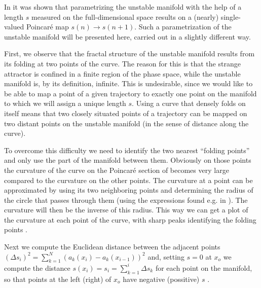 \documentclass[pre,preprint,groupedaddress,showpacs,showkeys]{revtex4}
\begin{document}
  In \cite{Christiansen:97} it was shown that parametrizing the unstable manifold with
  the help of a length $s$ measured on the full-dimensional space
  results on a (nearly) single-valued Poincar\'e map   $s(n) \rightarrow
  s(n+1)$. Such a parametrization of the
  unstable manifold will be presented here, carried out in a slightly
  different way.

  First, we observe that the fractal structure of the unstable
  manifold results from its folding at two points of the curve. The
  reason for this is that the strange attractor is confined in a
  finite region of the phase space, while the unstable manifold is, by
  its definition, infinite.
  This is undesirable, since we would like to be able to map a
  point of a given trajectory to exactly one point on the manifold to
  which we will assign a unique length $s$. Using a curve that densely
  folds on itself means that two closely situated points of a
  trajectory can be mapped on two distant points on the unstable
  manifold (in the sense of distance along the curve).

  To overcome this difficulty we need to identify the two nearest ``folding points'' and only
  use the part of the manifold between them. Obviously on those
  points the curvature of the curve on the Poincar\'e section of
   becomes very large compared to the curvature
  on the other points. The curvature at a point can be approximated by
  using its two neighboring points and determining the radius of the
  circle that passes through them (using the expressions found e.g. in
  \cite{circle}). The curvature will then be the
  inverse of this radius. This way we can get a plot of the curvature at
  each point of the curve, with sharp peaks identifying the folding
  points %
  .

  Next we compute the Euclidean distance between the
  adjacent points $(\Delta s_i)^2=\sum_{k=1}^N \left(a_k(x_i)-a_k(x_{i-1})\right)^2$ and,
  setting $s=0$ at $x_o$ we compute
  the distance $s(x_i)=s_i=\sum_{k=1}^i \Delta s_k $ for each point on the manifold, so that points
  at the left (right) of $x_o$ have negative (possitive) $s$ %
  .
\end{document}

